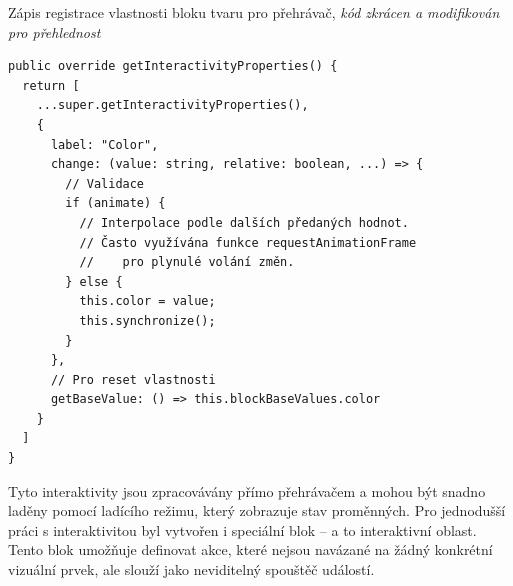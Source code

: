 \begin{listing}[ht!]
\caption[Zápis registrace vlastnosti bloku tvaru pro přehrávač]{Zápis registrace vlastnosti bloku tvaru pro přehrávač, \textit{kód zkrácen a modifikován pro přehlednost}}\label{code:zapisVlastnostiPrehravac}
\begin{verbatim}
public override getInteractivityProperties() {
  return [
    ...super.getInteractivityProperties(),
    {
      label: "Color",
      change: (value: string, relative: boolean, ...) => {
        // Validace
        if (animate) {
          // Interpolace podle dalších předaných hodnot.
          // Často využívána funkce requestAnimationFrame
          //    pro plynulé volání změn.
        } else {
          this.color = value;
          this.synchronize();
        }
      },
      // Pro reset vlastnosti
      getBaseValue: () => this.blockBaseValues.color
    }
  ]
}
\end{verbatim}
\end{listing}

Tyto interaktivity jsou zpracovávány přímo přehrávačem a mohou být snadno laděny pomocí ladícího režimu, který zobrazuje stav proměnných. 
Pro jednodušší práci s interaktivitou byl vytvořen i speciální blok -- a to interaktivní oblast.
Tento blok umožňuje definovat akce, které nejsou navázané na žádný konkrétní vizuální prvek, ale slouží jako neviditelný spouštěč událostí.





